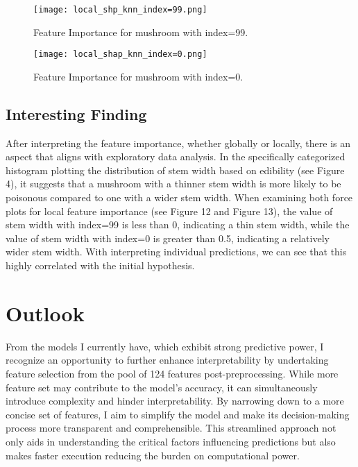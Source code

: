 \documentclass{article}
\begin{document}
\begin{figure}[h]
\centering
\texttt{[image: local\_shp\_knn\_index=99.png]}
\caption{\label{fig:frog} Feature Importance for mushroom with index=99.}
\end{figure}

\begin{figure}[h]
\centering
\texttt{[image: local\_shap\_knn\_index=0.png]}
\caption{\label{fig:frog} Feature Importance for mushroom with index=0.}
\end{figure}

\subsection{Interesting Finding}
\hspace{0.5cm} After interpreting the feature importance, whether globally or locally, there is an aspect that aligns with exploratory data analysis. In the specifically categorized histogram plotting the distribution of stem width based on edibility (see Figure 4), it suggests that a mushroom with a thinner stem width is more likely to be poisonous compared to one with a wider stem width. When examining both force plots for local feature importance (see Figure 12 and Figure 13), the value of stem width with index=99 is less than 0, indicating a thin stem width, while the value of stem width with index=0 is greater than 0.5, indicating a relatively wider stem width. With interpreting individual predictions, we can see that this highly correlated with the initial hypothesis.

\section{Outlook}
\hspace{0.5cm} From the models I currently have, which exhibit strong predictive power, I recognize an opportunity to further enhance interpretability by undertaking feature selection from the pool of 124 features post-preprocessing. While more feature set may contribute to the model's accuracy, it can simultaneously introduce complexity and hinder interpretability. By narrowing down to a more concise set of features, I aim to simplify the model and make its decision-making process more transparent and comprehensible. This streamlined approach not only aids in understanding the critical factors influencing predictions but also makes faster execution reducing the burden on computational power.
\end{document}
